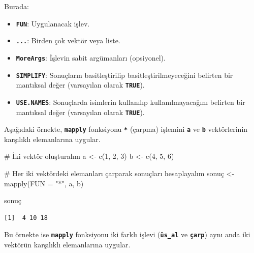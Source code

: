 \documentclass[
  letterpaper,
  DIV=11,
  numbers=noendperiod]{scrreprt}
\newenvironment{Shaded}{\begin{snugshade}}{\end{snugshade}}
\newcommand{\AttributeTok}[1]{\textcolor[rgb]{0.40,0.45,0.13}{#1}}
\newcommand{\CommentTok}[1]{\textcolor[rgb]{0.37,0.37,0.37}{#1}}
\newcommand{\DecValTok}[1]{\textcolor[rgb]{0.68,0.00,0.00}{#1}}
\newcommand{\FunctionTok}[1]{\textcolor[rgb]{0.28,0.35,0.67}{#1}}
\newcommand{\NormalTok}[1]{\textcolor[rgb]{0.00,0.23,0.31}{#1}}
\newcommand{\OtherTok}[1]{\textcolor[rgb]{0.00,0.23,0.31}{#1}}
\newcommand{\StringTok}[1]{\textcolor[rgb]{0.13,0.47,0.30}{#1}}
\begin{document}
Burada:

\begin{itemize}
\item
  \textbf{\texttt{FUN}}: Uygulanacak işlev.
\item
  \textbf{\texttt{...}}: Birden çok vektör veya liste.
\item
  \textbf{\texttt{MoreArgs}}: İşlevin sabit argümanları (opsiyonel).
\item
  \textbf{\texttt{SIMPLIFY}}: Sonuçların basitleştirilip
  basitleştirilmeyeceğini belirten bir mantıksal değer (varsayılan
  olarak \textbf{\texttt{TRUE}}).
\item
  \textbf{\texttt{USE.NAMES}}: Sonuçlarda isimlerin kullanılıp
  kullanılmayacağını belirten bir mantıksal değer (varsayılan olarak
  \textbf{\texttt{TRUE}}).
\end{itemize}

Aşağıdaki örnekte, \textbf{\texttt{mapply}} fonksiyonu
\textbf{\texttt{*}} (çarpma) işlemini \textbf{\texttt{a}} ve
\textbf{\texttt{b}} vektörlerinin karşılıklı elemanlarına uygular.

\begin{Shaded}
\begin{Highlighting}[]
\CommentTok{\# İki vektör oluşturalım}
\NormalTok{a }\OtherTok{\textless{}{-}} \FunctionTok{c}\NormalTok{(}\DecValTok{1}\NormalTok{, }\DecValTok{2}\NormalTok{, }\DecValTok{3}\NormalTok{)}
\NormalTok{b }\OtherTok{\textless{}{-}} \FunctionTok{c}\NormalTok{(}\DecValTok{4}\NormalTok{, }\DecValTok{5}\NormalTok{, }\DecValTok{6}\NormalTok{)}

\CommentTok{\# Her iki vektördeki elemanları çarparak sonuçları hesaplayalım}
\NormalTok{sonuç }\OtherTok{\textless{}{-}} \FunctionTok{mapply}\NormalTok{(}\AttributeTok{FUN =} \StringTok{"*"}\NormalTok{, a, b)}

\NormalTok{sonuç}
\end{Highlighting}
\end{Shaded}

\begin{verbatim}
[1]  4 10 18
\end{verbatim}

Bu örnekte ise \textbf{\texttt{mapply}} fonksiyonu iki farklı işlevi
(\textbf{\texttt{üs\_al}} ve \textbf{\texttt{çarp}}) aynı anda iki
vektörün karşılıklı elemanlarına uygular.
\end{document}
